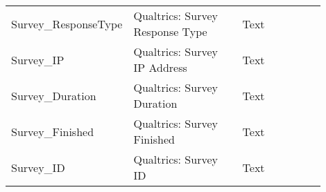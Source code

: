 \documentclass[12pt, letterpaper]{article}
\begin{document}
{\begin{longtable}{|p{0.2\linewidth}|p{0.4\linewidth}|p{0.1\linewidth}|p{0.2\linewidth}|}
Survey\_ResponseType         & Qualtrics: Survey Response Type                                                                                                                                                                                                                                                     & Text        &                                                                                                                                                                                                                                         \\
Survey\_IP                   & Qualtrics: Survey IP Address                                                                                                                                                                                                                                                        & Text        &                                                                                                                                                                                                                                         \\
Survey\_Duration             & Qualtrics: Survey Duration                                                                                                                                                                                                                                                          & Text        &                                                                                                                                                                                                                                         \\
Survey\_Finished             & Qualtrics: Survey Finished                                                                                                                                                                                                                                                          & Text        &                                                                                                                                                                                                                                         \\
Survey\_ID                   & Qualtrics: Survey ID                                                                                                                                                                                                                                                                & Text        &                                                                                                                                                                                                                                         \\

\end{longtable}}
\end{document}
